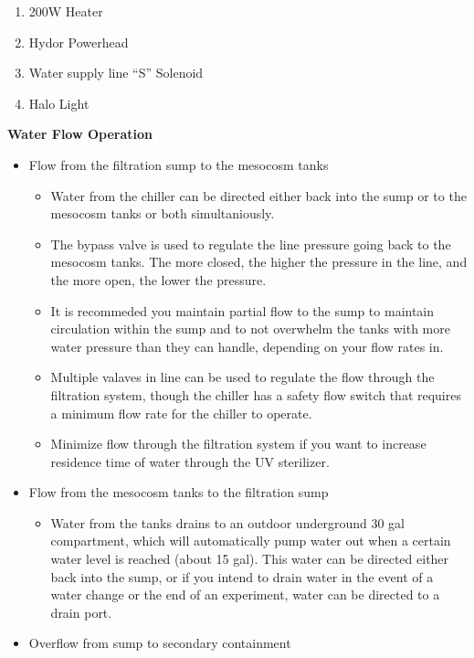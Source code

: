 \documentclass[]{book}
\providecommand{\tightlist}{%
  \setlength{\itemsep}{0pt}\setlength{\parskip}{0pt}}
\begin{document}
\begin{enumerate}
\def\labelenumi{\arabic{enumi}.}
\tightlist
\item
  200W Heater
\item
  Hydor Powerhead
\item
  Water supply line ``S'' Solenoid
\item
  Halo Light
\end{enumerate}

 \textbf{Water Flow Operation}

\begin{itemize}
\tightlist
\item
  Flow from the filtration sump to the mesocosm tanks

  \begin{itemize}
  \tightlist
  \item
    Water from the chiller can be directed either back into the sump or
    to the mesocosm tanks or both simultaniously.\\
  \item
    The bypass valve is used to regulate the line pressure going back to
    the mesocosm tanks. The more closed, the higher the pressure in the
    line, and the more open, the lower the pressure.\\
  \item
    It is recommeded you maintain partial flow to the sump to maintain
    circulation within the sump and to not overwhelm the tanks with more
    water pressure than they can handle, depending on your flow rates
    in.\\
  \item
    Multiple valaves in line can be used to regulate the flow through
    the filtration system, though the chiller has a safety flow switch
    that requires a minimum flow rate for the chiller to operate.\\
  \item
    Minimize flow through the filtration system if you want to increase
    residence time of water through the UV sterilizer.\\
  \end{itemize}
\item
  Flow from the mesocosm tanks to the filtration sump

  \begin{itemize}
  \tightlist
  \item
    Water from the tanks drains to an outdoor underground 30 gal
    compartment, which will automatically pump water out when a certain
    water level is reached (about 15 gal). This water can be directed
    either back into the sump, or if you intend to drain water in the
    event of a water change or the end of an experiment, water can be
    directed to a drain port.
  \end{itemize}
\item
  Overflow from sump to secondary containment


\end{itemize}
\end{document}
